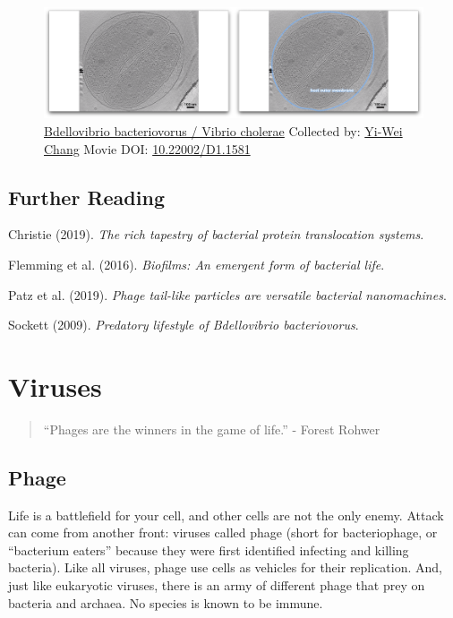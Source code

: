 \documentclass[]{tufte-book}
\begin{document}
\begin{figure}
\includegraphics{movie_stills/9_11} \caption[\protect\hyperlink{tree}{Bdellovibrio bacteriovorus / Vibrio
cholerae} Collected by: \protect\hyperlink{yi-wei_chang}{Yi-Wei Chang}
Movie DOI: \href{https://doi.org/10.22002/D1.1581}{10.22002/D1.1581}]{\protect\hyperlink{tree}{Bdellovibrio bacteriovorus / Vibrio
cholerae} Collected by: \protect\hyperlink{yi-wei_chang}{Yi-Wei Chang}
Movie DOI: \href{https://doi.org/10.22002/D1.1581}{10.22002/D1.1581}}\label{fig:9-11}
\end{figure}

\section{Further Reading}\label{further-reading}

Christie (2019). \emph{The rich tapestry of bacterial protein
translocation systems}.\citep{christie2019}

Flemming et al. (2016). \emph{Biofilms: An emergent form of bacterial
life}.\citep{flemming2016}

Patz et al. (2019). \emph{Phage tail-like particles are versatile
bacterial nanomachines}.\citep{patz2019}

Sockett (2009). \emph{Predatory lifestyle of Bdellovibrio
bacteriovorus}.\citep{sockett2009}

\chapter{Viruses}\label{viruses}

\begin{quote}
``Phages are the winners in the game of life.'' - Forest Rohwer
\citep{rohwer2014}
\end{quote}

\section{Phage}\label{phage}

Life is a battlefield for your cell, and other cells are not the only
enemy. Attack can come from another front: viruses called phage (short
for bacteriophage, or ``bacterium eaters'' because they were first
identified infecting and killing bacteria). Like all viruses, phage use
cells as vehicles for their replication. And, just like eukaryotic
viruses, there is an army of different phage that prey on bacteria and
archaea. No species is known to be immune.
\end{document}
